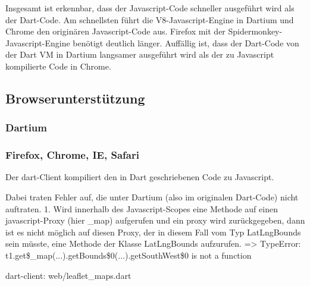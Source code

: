 Insgesamt ist erkennbar, dass der Javascript-Code schneller ausgeführt wird als der Dart-Code. Am schnellsten führt die V8-Javascript-Engine in Dartium und Chrome den originären Javascript-Code aus. Firefox mit der Spidermonkey-Javascript-Engine benötigt deutlich länger. Auffällig ist, dass der Dart-Code von der Dart VM in Dartium langsamer ausgeführt wird als der zu Javascript kompilierte Code in Chrome. 



\subsection{Browserunterstützung}
\subsubsection{Dartium}

\subsubsection{Firefox, Chrome, IE, Safari}

Der dart-Client kompiliert den in Dart geschriebenen Code zu Javascript.

Dabei traten Fehler auf, die unter Dartium (also im originalen Dart-Code) nicht auftraten.
1. Wird innerhalb des Javascript-Scopes eine Methode auf einen javascript-Proxy (hier \_map) aufgerufen und ein proxy wird zurückgegeben, dann ist es nicht möglich auf diesen Proxy, der in diesem Fall vom Typ LatLngBounds sein müsste, eine Methode der Klasse LatLngBounds aufzurufen. => TypeError: t1.get\$\_map(...).getBounds\$0(...).getSouthWest\$0 is not a function

dart-client: web/leaflet\_maps.dart

